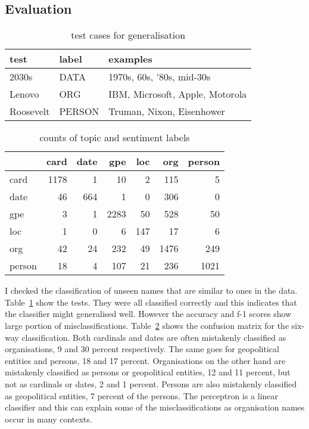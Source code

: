 \documentclass[11pt]{article}
\begin{document}
\subsection{Evaluation}

\begin{table}[ht]\footnotesize
\caption{test cases for generalisation}
\label{tab:generalisation}
\begin{tabular}{ l l l }
test & label & examples \\
\hline
2030s & DATA & 1970s, 60s, '80s, mid-30s \\
Lenovo & ORG & IBM, Microsoft, Apple, Motorola \\
Roosevelt & PERSON & Truman, Nixon, Eisenhower \\
\end{tabular}
\end{table}

\begin{table}[ht]\footnotesize
\caption{counts of topic and sentiment labels}
\label{tab:corpus}
\begin{tabular}{ l r r r r r r }
 & card & date &  gpe & loc & org  & person \\
\hline
  card   & 1178 &    1 &   10 &   2 &  115 &      5 \\
  date   &   46 &  664 &    1 &   0 &  306 &      0 \\
   gpe   &    3 &    1 & 2283 &  50 &  528 &     50 \\
   loc   &    1 &    0 &    6 & 147 &   17 &      6 \\
   org   &   42 &   24 &  232 &  49 & 1476 &    249 \\
person   &   18 &    4 &  107 &  21 &  236 &   1021 \\
\end{tabular}
\end{table}

I checked the classification of unseen names that are similar to ones in the data. Table~\ref{tab:generalisation} show the tests. They were all classified correctly and this indicates that the classifier might generalised well. However the accuracy and f-1 scores show large portion of misclassifications. Table~\ref{tab:corpus} shows the confusion matrix for the six-way classification. Both cardinals and dates are often mistakenly classified as organisations, 9 and 30 percent respectively. The same goes for geopolitical entities and persons, 18 and 17 percent. Organisations on the other hand are mistakenly classified as persons or geopolitical entities, 12 and 11 percent, but not as cardinals or dates, 2 and 1 percent. Persons are also mistakenly classified as geopolitical entities, 7 percent of the persons. The perceptron is a linear classifier and this can explain some of the misclassifications as organisation names occur in many contexts.



\end{document}
